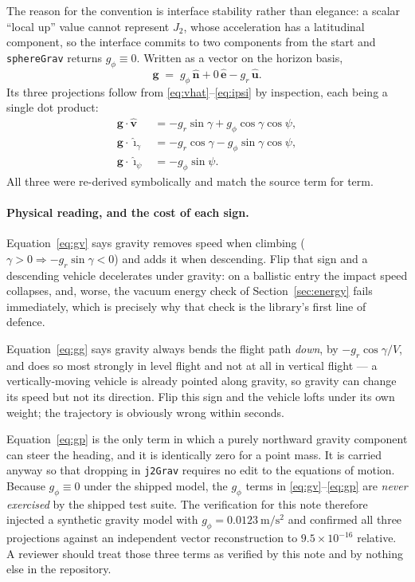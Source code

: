 \documentclass[11pt]{article}
\newcommand{\vhat}{\hat{\mathbf{v}}}
\newcommand{\ig}{\hat{\boldsymbol{\imath}}_{\gamma}}
\newcommand{\ip}{\hat{\boldsymbol{\imath}}_{\psi}}
\newcommand{\nhat}{\hat{\mathbf{n}}}
\newcommand{\ehat}{\hat{\mathbf{e}}}
\newcommand{\uhat}{\hat{\mathbf{u}}}
\newcommand{\code}[1]{\texttt{#1}}
\begin{document}
The reason for the convention is interface stability rather than elegance: a
scalar ``local up'' value cannot represent $J_2$, whose acceleration has a
latitudinal component, so the interface commits to two components from the
start and \code{sphereGrav} returns $g_\phi\equiv 0$. Written as a vector on the
horizon basis,
\begin{equation}
  \mathbf{g} \;=\; g_\phi\,\nhat + 0\,\ehat - g_r\,\uhat .
  \label{eq:gvec}
\end{equation}
Its three projections follow from \eqref{eq:vhat}--\eqref{eq:ipsi} by
inspection, each being a single dot product:
\begin{align}
  \mathbf{g}\cdot\vhat &= -g_r\sin\gamma + g_\phi\cos\gamma\cos\psi ,
    \label{eq:gv}\\
  \mathbf{g}\cdot\ig   &= -g_r\cos\gamma - g_\phi\sin\gamma\cos\psi ,
    \label{eq:gg}\\
  \mathbf{g}\cdot\ip   &= -g_\phi\sin\psi .
    \label{eq:gp}
\end{align}
All three were re-derived symbolically and match the source term for term.

\paragraph{Physical reading, and the cost of each sign.}
Equation~\eqref{eq:gv} says gravity removes speed when climbing
($\gamma>0 \Rightarrow -g_r\sin\gamma<0$) and adds it when descending. Flip that
sign and a descending vehicle decelerates under gravity: on a ballistic entry
the impact speed collapses, and, worse, the vacuum energy check of
Section~\ref{sec:energy} fails immediately, which is precisely why that check
is the library's first line of defence.

Equation~\eqref{eq:gg} says gravity always bends the flight path \emph{down},
by $-g_r\cos\gamma/V$, and does so most strongly in level flight and not at all
in vertical flight --- a vertically-moving vehicle is already pointed along
gravity, so gravity can change its speed but not its direction. Flip this sign
and the vehicle lofts under its own weight; the trajectory is obviously wrong
within seconds.

Equation~\eqref{eq:gp} is the only term in which a purely northward gravity
component can steer the heading, and it is identically zero for a point mass.
It is carried anyway so that dropping in \code{j2Grav} requires no edit to the
equations of motion. Because $g_\phi\equiv 0$ under the shipped model, the
$g_\phi$ terms in \eqref{eq:gv}--\eqref{eq:gp} are \emph{never exercised} by
the shipped test suite. The verification for this note therefore injected a
synthetic gravity model with $g_\phi=0.0123~\mathrm{m/s^2}$ and confirmed all
three projections against an independent vector reconstruction to
$9.5\times10^{-16}$ relative. A reviewer should treat those three terms as
verified by this note and by nothing else in the repository.
\end{document}

